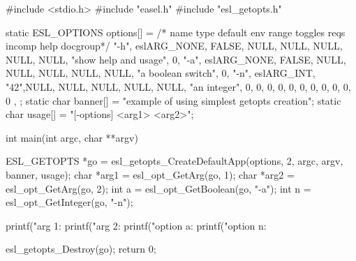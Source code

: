 \begin{cchunk}
#include <stdio.h>
#include "easel.h"
#include "esl_getopts.h"

static ESL_OPTIONS options[] = {
  /* name          type     default  env range toggles reqs incomp     help                   docgroup*/
  { "-h",     eslARG_NONE,   FALSE, NULL, NULL,  NULL, NULL, NULL, "show help and usage",            0},
  { "-a",     eslARG_NONE,   FALSE, NULL, NULL,  NULL, NULL, NULL, "a boolean switch",               0},
  { "-n",     eslARG_INT,      "42",NULL, NULL,  NULL, NULL, NULL, "an integer",                     0},
  { 0, 0, 0, 0, 0, 0, 0, 0, 0, 0 }, 
};
static char banner[] = "example of using simplest getopts creation";
static char usage[]  = "[-options] <arg1> <arg2>";

int
main(int argc, char **argv)
{
  ESL_GETOPTS *go   = esl_getopts_CreateDefaultApp(options, 2, argc, argv, banner, usage);
  char        *arg1 = esl_opt_GetArg(go, 1);
  char        *arg2 = esl_opt_GetArg(go, 2);
  int          a    = esl_opt_GetBoolean(go, "-a");
  int          n    = esl_opt_GetInteger(go, "-n");

  printf("arg 1: %
  printf("arg 2: %
  printf("option a: %
  printf("option n: %

  esl_getopts_Destroy(go);
  return 0;
}
\end{cchunk}
